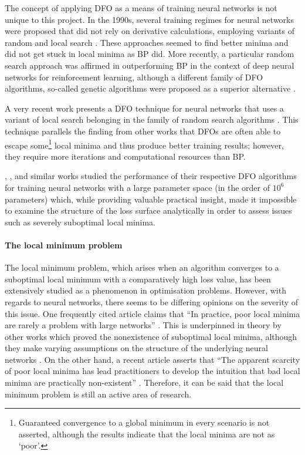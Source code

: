 The concept of applying DFO as a means of training neural networks is not unique to this project.
In the 1990s, several training regimes for neural networks were proposed that did not rely on derivative calculations, employing variants of random and local search \cite{hirasawa1998,battiti1995}.
These approaches seemed to find better minima and did not get stuck in local minima as BP did. 
More recently, a particular random search approach was affirmed in outperforming BP in the context of deep neural networks for reinforcement learning, although a different family of DFO algorithms, so-called genetic algorithms were proposed as a superior alternative \cite{such2017}.

A very recent work presents a DFO technique for neural networks that uses a variant of local search belonging in the family of random search algorithms \cite{aly2019}.
This technique parallels the finding from other works that DFOs are often able to escape some\footnote{Guaranteed convergence to a global minimum in every scenario is not asserted, although the results indicate that the local minima are not as `poor'.} local minima and thus produce better training results; however, they require more iterations and computational resources than BP. 

\citeauthor{aly2019}, \citeauthor{such2017}, and similar works studied the performance of their respective DFO algorithms for training neural networks with a large parameter space (in the order of $10^6$ parameters) which, while providing valuable practical insight, made it impossible to examine the structure of the loss surface analytically in order to assess issues such as severely suboptimal local minima.

\paragraph{The local minimum problem}
The local minimum problem, which arises when an algorithm converges to a suboptimal local minimum with a comparatively high loss value, has been extensively studied as a phenomenon in optimisation problems.
However, with regards to neural networks, there seems to be differing opinions on the severity of this issue. 
One frequently cited article claims that ``In practice, poor local minima are rarely a problem with large networks'' \cite{lecun2015}.
This is underpinned in theory by other works which proved the nonexistence of suboptimal local minima, although they make varying assumptions on the structure of the underlying neural networks \cite{kawaguchi2016,nguyen2018,laurent2018}.
On the other hand, a recent article asserts that ``The apparent scarcity of poor local minima has lead practitioners to develop the intuition that bad local minima \elide are practically non-existent'' \cite{goldblum2019}.
Therefore, it can be said that the local minimum problem is still an active area of research.


